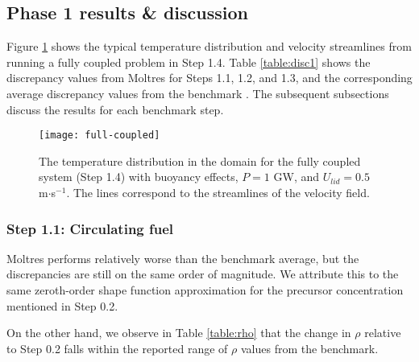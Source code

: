 \subsection{Phase 1 results \& discussion}

Figure \ref{fig:color} shows the typical temperature distribution and velocity
streamlines from running a fully coupled problem in Step 1.4. 
Table \ref{table:disc1} shows the discrepancy values from Moltres for Steps
1.1, 1.2, and 1.3,
and the corresponding average discrepancy values from the benchmark
\citep{tiberga_results_2020}. The subsequent subsections discuss the results
for each benchmark step.
%
\begin{figure}[H]
  \centering
  \texttt{[image: full-coupled]}
  \caption{The temperature distribution in the domain for the fully coupled
  system (Step 1.4) with buoyancy effects, $P = 1$ GW, and $U_{lid} = 0.5$
  m$\cdot$s$^{-1}$. The lines correspond to the streamlines of the velocity
  field.}
  \label{fig:color}
\end{figure}

\subsubsection{Step 1.1: Circulating fuel}

Moltres performs relatively worse than the benchmark average, but the
discrepancies are still on the same order of magnitude. We attribute this to
the same zeroth-order shape function approximation for the precursor
concentration mentioned in Step 0.2.

On the other hand, we observe in Table \ref{table:rho} that the change in
$\rho$ relative to Step 0.2 falls within the reported range of $\rho$ values
from the benchmark.

